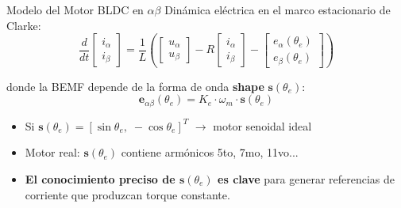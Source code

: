 
\begin{frame}{Modelo del Motor BLDC en $\alpha\beta$}
    Dinámica eléctrica en el marco estacionario de Clarke:
    \begin{equation}
        \frac{d}{dt}\begin{bmatrix} i_\alpha \\ i_\beta \end{bmatrix} 
        = \frac{1}{L}\left(
            \begin{bmatrix} u_\alpha \\ u_\beta \end{bmatrix}
            - R \begin{bmatrix} i_\alpha \\ i_\beta \end{bmatrix}
            - \begin{bmatrix} e_\alpha(\theta_e) \\ e_\beta(\theta_e) \end{bmatrix}
        \right)
    \end{equation}
    
    donde la BEMF depende de la forma de onda \textbf{shape} $\mathbf{s}(\theta_e)$:
    \begin{equation}
        \mathbf{e}_{\alpha\beta}(\theta_e) = K_e \cdot \omega_m \cdot \mathbf{s}(\theta_e)
    \end{equation}
    
    \begin{itemize}
        \item Si $\mathbf{s}(\theta_e) = [\sin\theta_e,\; -\cos\theta_e]^T$ $\rightarrow$ motor senoidal ideal
        \item Motor real: $\mathbf{s}(\theta_e)$ contiene armónicos 5to, 7mo, 11vo...
        \item \textbf{El conocimiento preciso de $\mathbf{s}(\theta_e)$ es clave} para generar referencias de corriente que produzcan torque constante.
    \end{itemize}
\end{frame}

